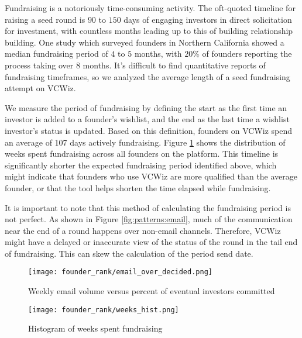 Fundraising is a notoriously time-consuming activity. The oft-quoted timeline for raising a seed round is $90$ to $150$ days of engaging investors in direct solicitation for investment, with countless months leading up to this of building relationship building. One study which surveyed founders in Northern California showed a median fundraising period of $4$ to $5$ months\cite{BRUNO198561}, with $20\%$ of founders reporting the process taking over $8$ months. It's difficult to find quantitative reports of fundraising timeframes, so we analyzed the average length of a seed fundraising attempt on VCWiz.

We measure the period of fundraising by defining the start as the first time an investor is added to a founder's wishlist, and the end as the last time a wishlist investor's status is updated. Based on this definition, founders on VCWiz spend an average of 107 days actively fundraising. Figure \ref{fig:patterns:fundraising} shows the distribution of weeks spent fundraising across all founders on the platform. This timeline is significantly shorter the expected fundraising period identified above, which might indicate that founders who use VCWiz are more qualified than the average founder, or that the tool helps shorten the time elapsed while fundraising.

It is important to note that this method of calculating the fundraising period is not perfect. As shown in Figure \ref{fig:patterns:email}, much of the communication near the end of a round happens over non-email channels. Therefore, VCWiz might have a delayed or inaccurate view of the status of the round in the tail end of fundraising. This can skew the calculation of the period send date.

\begin{figure}[ht]
  \centering
  \begin{minipage}[t]{0.5\textwidth}
    \centering
    \texttt{[image: founder\_rank/email\_over\_decided.png]}
    \caption{Weekly email volume versus percent of eventual investors committed}
    \label{fig:patterns:email}
  \end{minipage}\hfill
  \begin{minipage}[t]{0.5\textwidth}
    \centering
    \texttt{[image: founder\_rank/weeks\_hist.png]}
    \caption{Histogram of weeks spent fundraising}
    \label{fig:patterns:fundraising}
  \end{minipage}
\end{figure}


